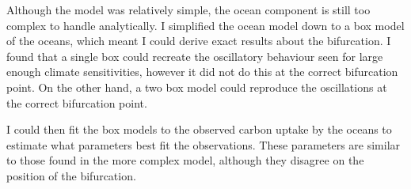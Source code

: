 Although the model was relatively simple, the ocean component is still too complex to handle analytically. I simplified the ocean model down to a box model of the oceans,
which meant I could derive exact results about the bifurcation. I found that a single box could recreate the oscillatory behaviour seen for large enough climate sensitivities,
however it did not do this at the correct bifurcation point. On the other hand, a two box model could reproduce the oscillations at the correct bifurcation point.

I could then fit the box models to the observed carbon uptake by the oceans to estimate what parameters best fit the observations. These parameters are similar to those found in the more
complex model, although they disagree on the position of the bifurcation.